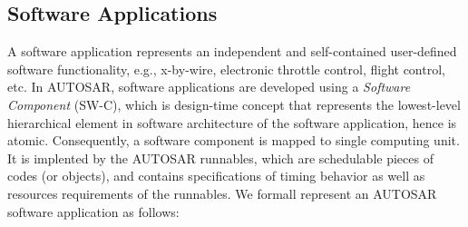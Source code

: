{\footnotesize 

\subsection{Software Applications}
A software application represents an independent and self-contained user-defined software functionality, e.g., x-by-wire, electronic throttle control, flight control, etc. In AUTOSAR, software applications are developed using a \textit{Software Component} (SW-C), which is design-time concept that represents the lowest-level hierarchical element in software architecture of the software application, hence is atomic. Consequently, a software component is mapped to single computing unit. It is implented by the AUTOSAR runnables, which are schedulable pieces of codes (or objects), and contains specifications of timing behavior as well as resources requirements of the runnables. We formall represent an AUTOSAR software application as follows:

}

